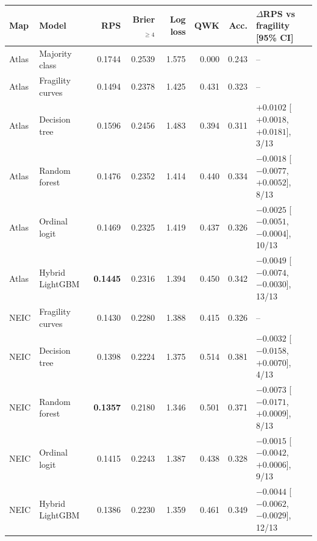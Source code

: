 \begin{tabular}{@{}llrrrrrl@{}}
\toprule
Map & Model & RPS & Brier$_{\geq 4}$ & Log loss & QWK & Acc. & $\Delta$RPS vs fragility [95\% CI] \\
\midrule
Atlas & Majority class & 0.1744 & 0.2539 & 1.575 & 0.000 & 0.243 & -- \\
Atlas & Fragility curves & 0.1494 & 0.2378 & 1.425 & 0.431 & 0.323 & -- \\
Atlas & Decision tree & 0.1596 & 0.2456 & 1.483 & 0.394 & 0.311 & $+0.0102$ [$+0.0018$, $+0.0181$], 3/13 \\
Atlas & Random forest & 0.1476 & 0.2352 & 1.414 & 0.440 & 0.334 & $-0.0018$ [$-0.0077$, $+0.0052$], 8/13 \\
Atlas & Ordinal logit & 0.1469 & 0.2325 & 1.419 & 0.437 & 0.326 & $-0.0025$ [$-0.0051$, $-0.0004$], 10/13 \\
Atlas & Hybrid LightGBM & \textbf{0.1445} & 0.2316 & 1.394 & 0.450 & 0.342 & $-0.0049$ [$-0.0074$, $-0.0030$], 13/13 \\
\midrule
NEIC & Fragility curves & 0.1430 & 0.2280 & 1.388 & 0.415 & 0.326 & -- \\
NEIC & Decision tree & 0.1398 & 0.2224 & 1.375 & 0.514 & 0.381 & $-0.0032$ [$-0.0158$, $+0.0070$], 4/13 \\
NEIC & Random forest & \textbf{0.1357} & 0.2180 & 1.346 & 0.501 & 0.371 & $-0.0073$ [$-0.0171$, $+0.0009$], 8/13 \\
NEIC & Ordinal logit & 0.1415 & 0.2243 & 1.387 & 0.438 & 0.328 & $-0.0015$ [$-0.0042$, $+0.0006$], 9/13 \\
NEIC & Hybrid LightGBM & 0.1386 & 0.2230 & 1.359 & 0.461 & 0.349 & $-0.0044$ [$-0.0062$, $-0.0029$], 12/13 \\
\bottomrule
\end{tabular}

